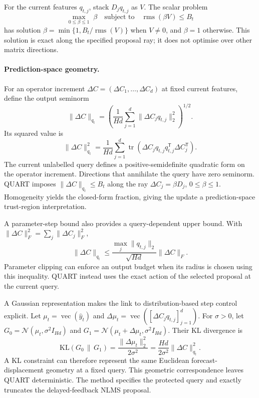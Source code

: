 \documentclass[11pt,a4paper]{article}
\newcommand{\rms}{\operatorname{rms}}
\begin{document}
For the current features $q_{t,j}$, stack $D_jq_{t,j}$ as $V$. The scalar problem
\[
\max_{0\leq\beta\leq1}\;\beta
\quad\text{subject to}\quad \rms(\beta V)\leq B_t
\]
has solution $\beta=\min\{1,B_t/\rms(V)\}$ when $V\ne0$, and $\beta=1$ otherwise. This solution is exact along the specified proposal ray; it does not optimise over other matrix directions.

\paragraph{Prediction-space geometry.}
For an operator increment $\Delta C=(\Delta C_1,\ldots,\Delta C_d)$ at fixed current features, define the output seminorm
\[
 \|\Delta C\|_{q_t}
 =\left(\frac{1}{Hd}\sum_{j=1}^{d}\|\Delta C_jq_{t,j}\|_2^2\right)^{1/2}.
\]
Its squared value is
\[
 \|\Delta C\|_{q_t}^2
 =\frac{1}{Hd}\sum_{j=1}^{d}
 \operatorname{tr}\!\left(\Delta C_jq_{t,j}q_{t,j}^{\mathsf T}\Delta C_j^{\mathsf T}\right).
\]
The current unlabelled query defines a positive-semidefinite quadratic form on the operator increment. Directions that annihilate the query have zero seminorm. QUART imposes $\|\Delta C\|_{q_t}\leq B_t$ along the ray $\Delta C_j=\beta D_j$, $0\leq\beta\leq1$. Homogeneity yields the closed-form fraction, giving the update a prediction-space trust-region interpretation.

A parameter-step bound also provides a query-dependent upper bound. With $\|\Delta C\|_F^2=\sum_j\|\Delta C_j\|_F^2$,
\[
 \|\Delta C\|_{q_t}
 \leq\frac{\max_j\|q_{t,j}\|_2}{\sqrt{Hd}}\|\Delta C\|_F.
\]
Parameter clipping can enforce an output budget when its radius is chosen using this inequality. QUART instead uses the exact action of the selected proposal at the current query.

A Gaussian representation makes the link to distribution-based step control explicit. Let $\mu_t=\operatorname{vec}(\widehat y_t)$ and $\Delta\mu_t=\operatorname{vec}([\Delta C_jq_{t,j}]_{j=1}^d)$. For $\sigma>0$, let $G_0=\mathcal N(\mu_t,\sigma^2I_{Hd})$ and $G_1=\mathcal N(\mu_t+\Delta\mu_t,\sigma^2I_{Hd})$. Their KL divergence is
\[
 \mathrm{KL}(G_0\,\|\,G_1)
 =\frac{\|\Delta\mu_t\|_2^2}{2\sigma^2}
 =\frac{Hd}{2\sigma^2}\|\Delta C\|_{q_t}^2.
\]
A KL constraint can therefore represent the same Euclidean forecast-displacement geometry at a fixed query. This geometric correspondence leaves QUART deterministic. The method specifies the protected query and exactly truncates the delayed-feedback NLMS proposal.
\end{document}
